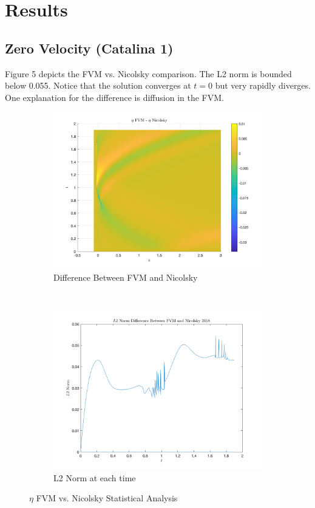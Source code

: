 \documentclass{article}
\begin{document}
\section{Results}

\subsection{Zero Velocity (Catalina 1)}

Figure 5 depicts the FVM vs. Nicolsky comparison. The L2 norm is bounded below 0.055. Notice that the solution converges at $t=0$ but very rapidly diverges. One explanation for the difference is diffusion in the FVM.

\begin{figure}[t!]
    \centering
    \begin{subfigure}[b]{0.5\textwidth}
        \centering
        \includegraphics[scale=.25]{images/diff_FVM_Nicolsky_0u.png} 
        \caption{Difference Between FVM and Nicolsky}
    \end{subfigure}%
    ~ 
    \begin{subfigure}[b]{0.5\textwidth}
        \centering
        \includegraphics[scale=.25]{images/l2_FVM_Nicolsky_0u.png}
        \caption{L2 Norm at each time}
    \end{subfigure}
    \caption{$\eta$ FVM vs. Nicolsky Statistical Analysis}
\end{figure}
\end{document}
